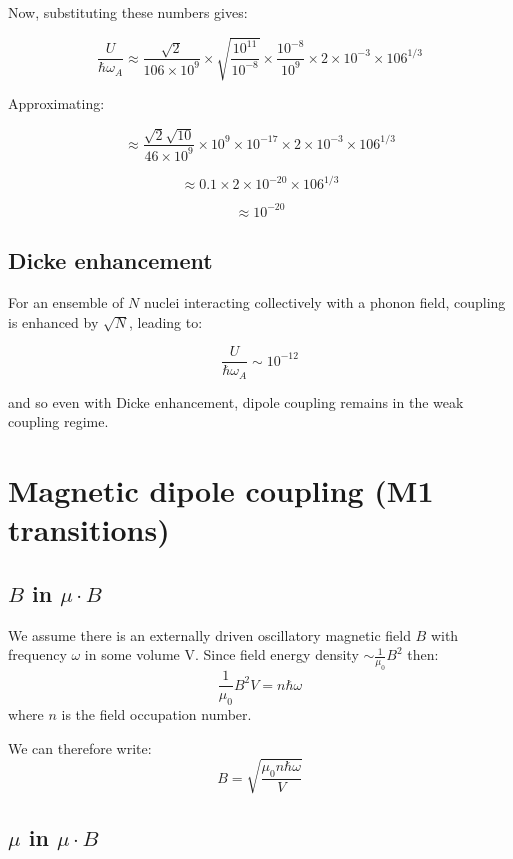 \documentclass[
]{article}
\renewcommand{\[}{\begin{equation}}
\renewcommand{\]}{\end{equation}}
\begin{document}
Now, substituting these numbers gives:

\[
\frac{U}{\hbar \omega_A} \approx \frac{\sqrt{2} }{106 \times 10^9} \times \sqrt{\frac{10^{11}}{10^{-8}}} \times \frac{10^{-8}}{10^9} \times 2 \times 10^{-3} \times 106^{1/3}
\]

Approximating:

\[
\approx \frac{\sqrt{2} \sqrt{10}}{46 \times 10^9} \times 10^9 \times 10^{-17} \times 2 \times 10^{-3} \times 106^{1/3}
\]

\[
\approx 0.1 \times 2 \times 10^{-20} \times 106^{1/3}
\]

\[
\approx 10^{-20}
\]

\subsection{Dicke enhancement}\label{dicke-enhancement-1}

For an ensemble of \(N\) nuclei interacting collectively with a phonon
field, coupling is enhanced by \(\sqrt{N}\), leading to:

\[
\frac{U}{\hbar \omega_A} \sim 10^{-12}
\]

and so even with Dicke enhancement, dipole coupling remains in the weak
coupling regime.

\section{Magnetic dipole coupling (M1
transitions)}\label{magnetic-dipole-coupling-m1-transitions}

\subsection{\texorpdfstring{\(B\) in
\(\mu\cdot B\)}{B in \textbackslash mu\textbackslash cdot B}}\label{b-in-mucdot-b}

We assume there is an externally driven oscillatory magnetic field \(B\)
with frequency \(\omega\) in some volume V. Since field energy density
\(\sim \frac{1}{\mu_0}B^2\) then: \[
\frac{1}{\mu_0} B^2 V = n\hbar\omega
\] where \(n\) is the field occupation number.

We can therefore write: \[
B = \sqrt{\frac{\mu_0n\hbar\omega}{V}}
\label{eq:B}
\]

\subsection{\texorpdfstring{\(\mu\) in
\(\mu \cdot B\)}{\textbackslash mu in \textbackslash mu \textbackslash cdot B}}\label{mu-in-mu-cdot-b}
\end{document}
